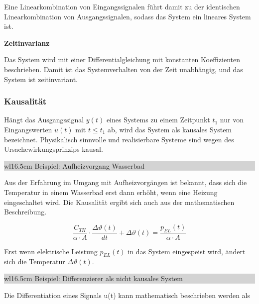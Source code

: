 \noindent Eine Linearkombination von Eingangssignalen führt damit zu der identischen Linearkombination von Ausgangssignalen, sodass das System ein lineares System ist. \bigskip

{\selectfont
\noindent\textbf{Zeitinvarianz}}\smallskip

\noindent Das System wird mit einer Differentialgleichung mit konstanten Koeffizienten beschrieben. Damit ist das Systemverhalten von der Zeit unabhängig, und das System ist zeitinvariant.

\subsubsection{Kausalität}

\noindent Hängt das Ausgangssignal $y(t)$ eines Systems zu einem Zeitpunkt $t_{1}$ nur von Eingangswerten $u(t)$ mit $t \leqslant  t_{1}$ ab, wird das System als kausales System bezeichnet. Physikalisch sinnvolle und realisierbare Systeme sind wegen des Ursachewirkungsprinzips kausal.\bigskip

\noindent
\colorbox{lightgray}{%
%
\renewcommand\arraystretch{0.6}%
\begin{tabular}{ wl{16.5cm} }
Beispiel: Aufheizvorgang Wasserbad 
\end{tabular}%
}\bigskip

\noindent Aus der Erfahrung im Umgang mit Aufheizvorgängen ist bekannt, dass sich die Temperatur in einem Wasserbad erst dann erhöht, wenn eine Heizung eingeschaltet wird. Die Kausalität ergibt sich auch aus der mathematischen Beschreibung.

\begin{equation}\label{eq:threefiftytwo}
\frac{C_{TH}}{\alpha\cdot A} \cdot \frac{\Delta\vartheta(t)}{dt} + \Delta\vartheta(t) = \frac{p_{EL}(t)}{\alpha\cdot A}
\end{equation}

\noindent Erst wenn elektrische Leistung $p_{EL}(t)$ in das System eingespeist wird, ändert sich die Temperatur
$\Delta\vartheta(t)$.\bigskip

\noindent
\colorbox{lightgray}{%
%
\renewcommand\arraystretch{0.6}%
\begin{tabular}{ wl{16.5cm} }
Beispiel: Differenzierer als nicht kausales System
\end{tabular}%
}\bigskip

\noindent Die Differentiation eines Signals u(t) kann mathematisch beschrieben werden als

